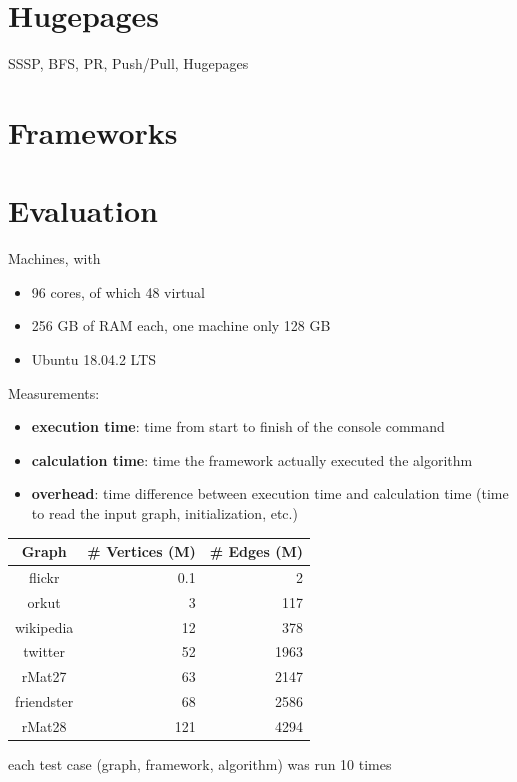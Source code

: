 \documentclass{meetings}
\begin{document}
\clearpage
\section{Hugepages}


SSSP, BFS, PR, Push/Pull, Hugepages

\clearpage
\section{Frameworks}

\clearpage
\section{Evaluation}
\begin{multicols}{2}
 Machines, with
\begin{itemize}
	\item 96 cores, of which 48 virtual
	\item 256 GB of RAM each, one machine only 128 GB
	\item Ubuntu 18.04.2 LTS
\end{itemize}
\noindent Measurements:
\begin{itemize}
	\item \textbf{execution time}: time from start to finish of the console command
	\item \textbf{calculation time}: time the framework actually executed the algorithm
	\item \textbf{overhead}: time difference between execution time and calculation time \newline (time to read the input graph, initialization, etc.)
\end{itemize}

\renewcommand{\arraystretch}{1.2}%
{%
\noindent
\centering
	\begin{tabular}{crr}
		\hline
		\bf{Graph}&\# Vertices (M)&\# Edges (M)\\\hline
		flickr&    		0.1&  2\\
		orkut&          3&    117\\
		wikipedia&      12&   378\\
		twitter&     	52&   1963\\
		rMat27&         63&   2147\\
		friendster&     68&   2586\\
		rMat28&         121&  4294\\
		\hline
	\end{tabular}
}%

each test case (graph, framework, algorithm) was run 10 times
\end{multicols}
\end{document}
